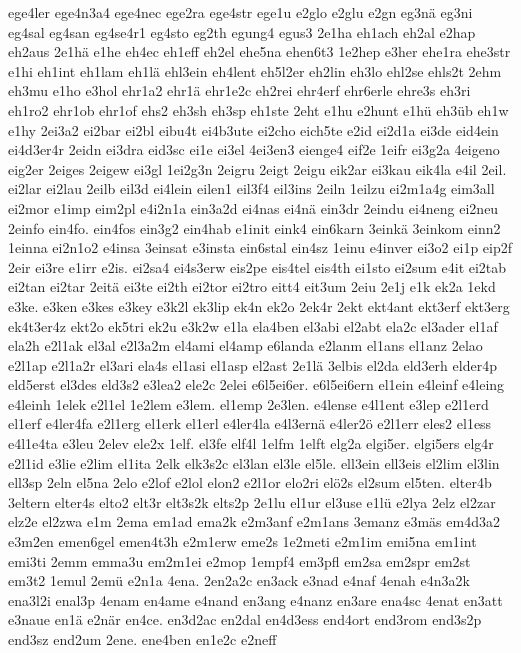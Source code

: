 {ege4ler
ege4n3a4
ege4nec
ege2ra
ege4str
ege1u
e2glo
e2glu
e2gn
eg3nä
eg3ni
eg4sal
eg4san
eg4se4r1
eg4sto
eg2th
egung4
egus3
2e1ha
eh1ach
eh2al
e2hap
eh2aus
2e1hä
e1he
eh4ec
eh1eff
eh2el
ehe5na
ehen6t3
1e2hep
e3her
ehe1ra
ehe3str
e1hi
eh1int
eh1lam
eh1lä
ehl3ein
eh4lent
eh5l2er
eh2lin
eh3lo
ehl2se
ehls2t
2ehm
eh3mu
e1ho
e3hol
ehr1a2
ehr1ä
ehr1e2c
eh2rei
ehr4erf
ehr6erle
ehre3s
eh3ri
eh1ro2
ehr1ob
ehr1of
ehs2
eh3sh
eh3sp
eh1ste
2eht
e1hu
e2hunt
e1hü
eh3üb
eh1w
e1hy
2ei3a2
ei2bar
ei2bl
eibu4t
ei4b3ute
ei2cho
eich5te
e2id
ei2d1a
ei3de
eid4ein
ei4d3er4r
2eidn
ei3dra
eid3sc
ei1e
ei3el
4ei3en3
eienge4
eif2e
1eifr
ei3g2a
4eigeno
eig2er
2eiges
2eigew
ei3gl
1ei2g3n
2eigru
2eigt
2eigu
eik2ar
ei3kau
eik4la
e4il
2eil.
ei2lar
ei2lau
2eilb
eil3d
ei4lein
eilen1
eil3f4
eil3ins
2eiln
1eilzu
ei2m1a4g
eim3all
ei2mor
e1imp
eim2pl
e4i2n1a
ein3a2d
ei4nas
ei4nä
ein3dr
2eindu
ei4neng
ei2neu
2einfo
ein4fo.
ein4fos
ein3g2
ein4hab
e1init
eink4
ein6karn
3einkä
3einkom
einn2
1einna
ei2n1o2
e4insa
3einsat
e3insta
ein6stal
ein4sz
1einu
e4inver
ei3o2
ei1p
eip2f
2eir
ei3re
e1irr
e2is.
ei2sa4
ei4s3erw
eis2pe
eis4tel
eis4th
ei1sto
ei2sum
e4it
ei2tab
ei2tan
ei2tar
2eitä
ei3te
ei2th
ei2tor
ei2tro
eitt4
eit3um
2eiu
2e1j
e1k
ek2a
1ekd
e3ke.
e3ken
e3kes
e3key
e3k2l
ek3lip
ek4n
ek2o
2ek4r
2ekt
ekt4ant
ekt3erf
ekt3erg
ek4t3er4z
ekt2o
ek5tri
ek2u
e3k2w
e1la
ela4ben
el3abi
el2abt
ela2c
el3ader
el1af
ela2h
e2l1ak
el3al
e2l3a2m
el4ami
el4amp
e6landa
e2lanm
el1ans
el1anz
2elao
e2l1ap
e2l1a2r
el3ari
ela4s
el1asi
el1asp
el2ast
2e1lä
3elbis
el2da
eld3erh
elder4p
eld5erst
el3des
eld3s2
e3lea2
ele2c
2elei
e6l5ei6er.
e6l5ei6ern
el1ein
e4leinf
e4leing
e4leinh
1elek
e2l1el
1e2lem
e3lem.
el1emp
2e3len.
e4lense
e4l1ent
e3lep
e2l1erd
el1erf
e4ler4fa
e2l1erg
el1erk
el1erl
e4ler4la
e4l3ernä
e4ler2ö
e2l1err
eles2
el1ess
e4l1e4ta
e3leu
2elev
ele2x
1elf.
el3fe
elf4l
1elfm
1elft
elg2a
elgi5er.
elgi5ers
elg4r
e2l1id
e3lie
e2lim
el1ita
2elk
elk3s2c
el3lan
el3le
el5le.
ell3ein
ell3eis
el2lim
el3lin
ell3sp
2eln
el5na
2elo
e2lof
e2lol
elon2
e2l1or
elo2ri
elö2s
el2sum
el5ten.
elter4b
3eltern
elter4s
elto2
elt3r
elt3s2k
elts2p
2e1lu
el1ur
el3use
e1lü
e2lya
2elz
el2zar
elz2e
el2zwa
e1m
2ema
em1ad
ema2k
e2m3anf
e2m1ans
3emanz
e3mäs
em4d3a2
e3m2en
emen6gel
emen4t3h
e2m1erw
eme2s
1e2meti
e2m1im
emi5na
em1int
emi3ti
2emm
emma3u
em2m1ei
e2mop
1empf4
em3pfl
em2sa
em2spr
em2st
em3t2
1emul
2emü
e2n1a
4ena.
2en2a2c
en3ack
e3nad
e4naf
4enah
e4n3a2k
ena3l2i
enal3p
4enam
en4ame
e4nand
en3ang
e4nanz
en3are
ena4sc
4enat
en3att
e3naue
en1ä
e2när
en4ce.
en3d2ac
en2dal
en4d3ess
end4ort
end3rom
end3s2p
end3sz
end2um
2ene.
ene4ben
en1e2c
e2neff
}
